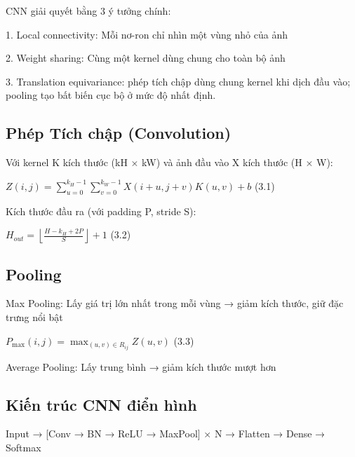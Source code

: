 CNN giải quyết bằng 3 ý tưởng chính:

1. Local connectivity: Mỗi nơ-ron chỉ nhìn một vùng nhỏ của ảnh

2. Weight sharing: Cùng một kernel dùng chung cho toàn bộ ảnh

3. Translation equivariance: phép tích chập dùng chung kernel khi dịch
đầu vào; pooling tạo bất biến cục bộ ở mức độ nhất định.

\subsection{Phép Tích chập (Convolution)}\label{phuxe9p-tuxedch-chux1eadp-convolution}

Với kernel K kích thước (kH × kW) và ảnh đầu vào X kích thước (H × W):

\(Z(i,j) = \sum_{u = 0}^{k_{H} - 1}{\sum_{v = 0}^{k_{W} - 1}X}(i + u,j + v)K(u,v) + b\)
(3.1)

Kích thước đầu ra (với padding P, stride S):

\(H_{out} = \left\lfloor \frac{H - k_{H} + 2P}{S} \right\rfloor + 1\)
(3.2)

\subsection{Pooling}\label{pooling}

Max Pooling: Lấy giá trị lớn nhất trong mỗi vùng → giảm kích thước, giữ
đặc trưng nổi bật

\(P_{\max}(i,j) = \max_{(u,v) \in R_{ij}}Z(u,v)\) (3.3)

Average Pooling: Lấy trung bình → giảm kích thước mượt hơn

\subsection{Kiến trúc CNN điển hình}\label{kiux1ebfn-truxfac-CNN-ux111iux1ec3n-huxecnh}

Input → {[}Conv → BN → ReLU → MaxPool{]} × N → Flatten → Dense → Softmax

\label{tab:legacy-3.1}

